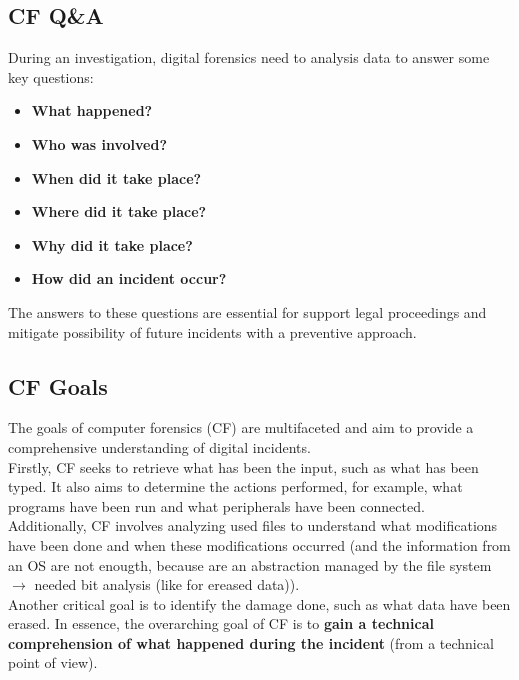 \subsection{CF Q\&A}
During an investigation, digital forensics need to analysis data to answer some key questions: \\
\begin{minipage}[t]{0.45\textwidth}
\begin{itemize}
    \item \textbf{What happened?}
    \item \textbf{Who was involved?}
    \item \textbf{When did it take place?}
\end{itemize}
\end{minipage}
\begin{minipage}[t]{0.45\textwidth}
\begin{itemize}
    \item \textbf{Where did it take place?}
    \item \textbf{Why did it take place?}
    \item \textbf{How did an incident occur?} \newline
\end{itemize}
\end{minipage} 

The answers to these questions are essential for support legal proceedings and mitigate 
possibility of future incidents with a preventive approach.

\subsection{CF Goals}

The goals of computer forensics (CF) are multifaceted and aim to provide a
comprehensive understanding of digital incidents. \\
Firstly, CF seeks to retrieve what has been the input, such as what has been typed. 
It also aims to determine the actions performed, for example, what programs have been run 
and what peripherals have been connected. \\
Additionally, CF involves analyzing used files to understand what modifications 
have been done and when these modifications occurred (and the information from an OS 
are not enougth, because are an abstraction managed by the file system $\rightarrow$ needed 
bit analysis (like for ereased data)). \\ 
Another critical goal is to identify the damage done, 
such as what data have been erased. In essence, the overarching goal 
of CF is to \textbf{gain a technical comprehension of what happened during the 
incident} (from a technical point of view).
